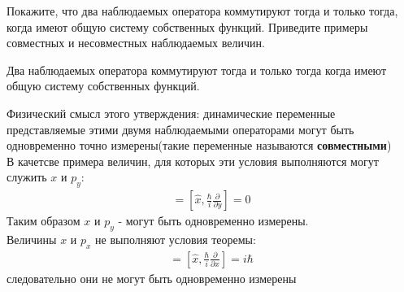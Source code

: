 \documentclass[__main__.tex]{subfiles}
\begin{document}
Покажите, что два наблюдаемых оператора коммутируют тогда и только тогда, когда имеют общую систему собственных функций. Приведите примеры совместных и несовместных наблюдаемых величин.\\

\begin{theorem}
    Два наблюдаемых оператора коммутируют тогда и только тогда когда имеют общую систему собственных функций.
\end{theorem}
Физический смысл этого утверждения: динамические переменные представляемые этими двумя наблюдаемыми операторами могут быть одновременно точно измерены(такие переменные называются \textbf{совместными})\\

В качетсве примера величин, для которых эти условия выполняются могут служить $x$ и $p_y$:
\begin{gather*}
    [\hat{x},\hat{p_y}] = \left[\hat{x},\frac{\hbar}{i}\frac{\partial}{\partial y}\right] = 0
\end{gather*}
Таким образом $x$ и $p_y$ - могут быть одновременно измерены.\\
Величины $x$ и $p_x$ не выполняют условия теоремы:
\begin{gather*}
    [\hat{x},\hat{p_x}] = \left[\hat{x},\frac{\hbar}{i}\frac{\partial}{\partial x}\right] = i\hbar
\end{gather*}
следовательно они не могут быть одновременно измерены
\end{document}
